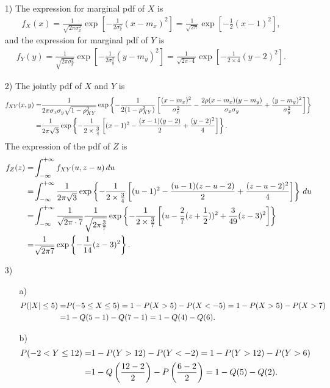 \documentclass{assignment}
\begin{document}
\begin{sol}
    \begin{itemize}
        \item[1)] The expression for marginal pdf of $X$ is
        \begin{align}
            f_X(x)=\frac{1}{\sqrt{2\pi\sigma_x^2}}\exp\left[-\frac{1}{2\sigma_x^2}(x-m_x)^2\right]=\frac{1}{\sqrt{2\pi}}\exp\left[-\frac{1}{2}(x-1)^2\right],
        \end{align}
        and the expression for marginal pdf of $Y$ is
        \begin{align}
            f_Y(y)=\frac{1}{\sqrt{2\pi\sigma_y^2}}\exp\left[-\frac{1}{2\sigma_y^2}(y-m_y)^2\right]=\frac{1}{\sqrt{2\pi\cdot 4}}\exp\left[-\frac{1}{2\times 4}(y-2)^2\right].
        \end{align}
        \item[2)] The jointly pdf of $X$ and $Y$ is
        \begin{align}
            \notag f_{XY}(x,y)=&\frac{1}{2\pi\sigma_x\sigma_y\sqrt{1-\rho_{XY}^2}}\exp\left\{-\frac{1}{2(1-\rho_{XY}^2)}\left[\frac{(x-m_x)^2}{\sigma_x^2}-\frac{2\rho(x-m_x)(y-m_y)}{\sigma_x\sigma_y}+\frac{(y-m_y)^2}{\sigma_y^2}\right]\right\}\\
            =&\frac{1}{2\pi\sqrt{3}}\exp\left\{-\frac{1}{2\times\frac{3}{4}}\left[(x-1)^2-\frac{(x-1)(y-2)}{2}+\frac{(y-2)^2}{4}\right]\right\}.
        \end{align}
        The expression of the pdf of $Z$ is
        \begin{align}
            \notag f_Z(z)=&\int_{-\infty}^{+\infty}f_{XY}(u,z-u)\,du\\
            \notag=&\int_{-\infty}^{+\infty}\frac{1}{2\pi\sqrt{3}}\exp\left\{-\frac{1}{2\times\frac{3}{4}}\left[(u-1)^2-\frac{(u-1)(z-u-2)}{2}+\frac{(z-u-2)^2}{4}\right]\right\}\,du\\
            \notag=&\int_{-\infty}^{+\infty}\frac{1}{\sqrt{2\pi\cdot 7}}\frac{1}{\sqrt{2\pi\frac{3}{7}}}\exp\left\{-\frac{1}{2\times\frac{3}{7}}\left[(u-\frac{2}{7}(z+\frac{1}{2}))^2+\frac{3}{49}(z-3)^2\right]\right\}\\
            =&\frac{1}{\sqrt{2\pi 7}}\exp\left\{-\frac{1}{14}(z-3)^2\right\}.
        \end{align}
        \item[3)] 
        \begin{itemize}
            \item[a)] 
            \begin{align}
                \notag P(\left\lvert X\right\rvert\leq 5)=&P(-5\leq X\leq 5)=1-P(X>5)-P(X<-5)=1-P(X>5)-P(X>7)\\
                =&1-Q(5-1)-Q(7-1)=1-Q(4)-Q(6).
            \end{align}
            \item[b)] 
            \begin{align}
                \notag P(-2<Y\leq 12)=&1-P(Y>12)-P(Y<-2)=1-P(Y>12)-P(Y>6)\\
                =&1-Q\left(\frac{12-2}{2}\right)-P\left(\frac{6-2}{2}\right)=1-Q(5)-Q(2).
            \end{align}
        \end{itemize}
    \end{itemize}
\end{sol}
\end{document}

